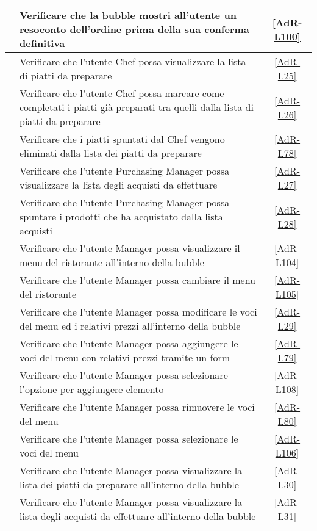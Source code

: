 \begin{longtable}{|c|P{9cm}|c|}
	\hline {} & Verificare che la bubble mostri all'utente un resoconto dell'ordine prima della sua conferma definitiva & \ref{AdR-L100} \\
	\hline {} & Verificare che l'utente Chef possa visualizzare la lista di piatti da preparare & \ref{AdR-L25} \\
	\hline {} & Verificare che l'utente Chef possa marcare come completati i piatti già preparati tra quelli dalla lista di piatti da preparare  & \ref{AdR-L26} \\
	\hline {} & Verificare che i piatti spuntati dal Chef vengono eliminati dalla lista dei piatti da preparare & \ref{AdR-L78} \\
	\hline {} & Verificare che l'utente Purchasing Manager possa visualizzare la lista degli acquisti da effettuare & \ref{AdR-L27} \\
	\hline {} & Verificare che l'utente Purchasing Manager possa spuntare i prodotti che ha acquistato dalla lista acquisti & \ref{AdR-L28} \\
	\hline {} & Verificare che l'utente Manager possa visualizzare il menu del ristorante all’interno della bubble & \ref{AdR-L104}  \\
	\hline {} & Verificare che l'utente Manager possa cambiare il menu del ristorante & \ref{AdR-L105} \\
	\hline {} & Verificare che l'utente Manager possa modificare le voci del menu ed i relativi prezzi all’interno della bubble & \ref{AdR-L29} \\
	\hline {} & Verificare che l'utente Manager possa aggiungere le voci del menu con relativi prezzi tramite un form & \ref{AdR-L79} \\
	\hline {} & Verificare che l'utente Manager possa selezionare l'opzione per aggiungere elemento & \ref{AdR-L108} \\
	\hline {} & Verificare che l'utente Manager possa rimuovere le voci del menu & \ref{AdR-L80} \\
	\hline {} & Verificare che l'utente Manager possa selezionare le voci del menu & \ref{AdR-L106} \\
	\hline {} & Verificare che l'utente Manager possa visualizzare la lista dei piatti da preparare all’interno della bubble & \ref{AdR-L30} \\
	\hline {} & Verificare che l'utente Manager possa visualizzare la lista degli acquisti da effettuare all’interno della bubble & \ref{AdR-L31} \\

\end{longtable}
